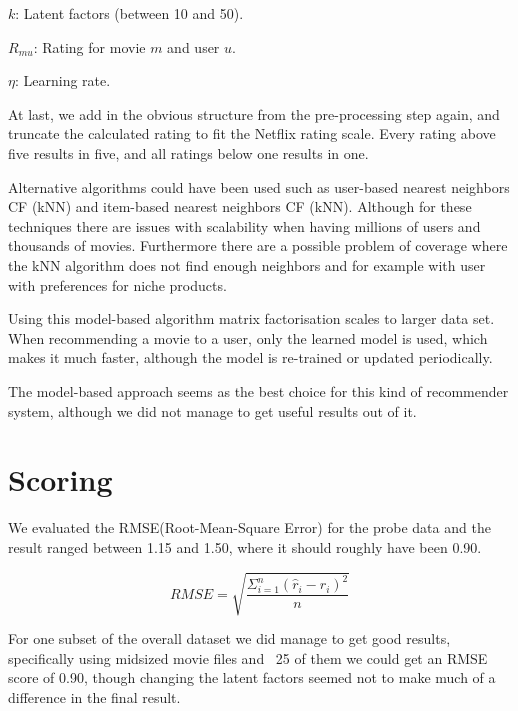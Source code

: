 	\begin{description}
		\item $k$: Latent factors (between 10 and 50).
		\item $R_{mu}$: Rating for movie $m$ and user $u$.
		\item $\eta$: Learning rate.
	\end{description}
	
	At last, we add in the obvious structure from the pre-processing step again, and truncate the calculated rating to fit the Netflix rating scale. Every rating above five results in five, and all ratings below one results in one.
	
	Alternative algorithms could have been used such as user-based nearest neighbors CF (kNN) and item-based nearest neighbors CF (kNN). Although for these techniques there are issues with scalability when having millions of users and thousands of movies. Furthermore there are a possible problem of coverage where the kNN algorithm does not find enough neighbors and for example with user with preferences for niche products.
	
	Using this model-based algorithm matrix factorisation scales to larger data set. When recommending a movie to a user, only the learned model is used, which makes it much faster, although the model is re-trained or updated periodically.
	
	The model-based approach seems as the best choice for this kind of recommender system, although we did not manage to get useful results out of it.
	
	\section{Scoring}
	We evaluated the RMSE(Root-Mean-Square Error) for the probe data and the result ranged between 1.15 and 1.50, where it should roughly have been 0.90.
	
	$$RMSE = \sqrt{\frac{\Sigma_{i = 1}^{n} (\hat{r}_i - r_i)^2}{n}}$$
	
	For one subset of the overall dataset we did manage to get good results, specifically using midsized movie files and ~25 of them we could get an RMSE score of 0.90, though changing the latent factors seemed not to make much of a difference in the final result.


